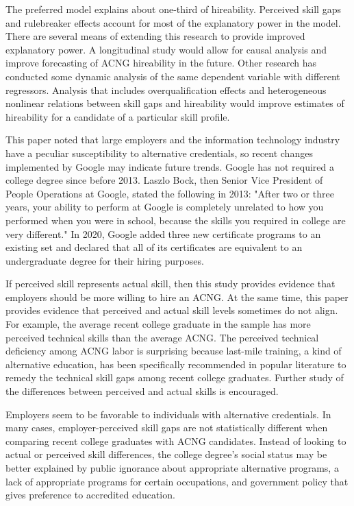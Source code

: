 \documentclass[review]{elsarticle}
\begin{document}
The preferred model explains about one-third of hireability.
Perceived skill gaps and rulebreaker effects account for most of the explanatory power in the model.
There are several means of extending this research to provide improved explanatory power.
A longitudinal study would allow for causal analysis and improve forecasting of ACNG hireability in the future.
Other research has conducted some dynamic analysis of the same dependent variable with different regressors\cite{vandivier2020preliminary}.
Analysis that includes overqualification effects and heterogeneous nonlinear relations between skill gaps and hireability would improve estimates of hireability for a candidate of a particular skill profile.

This paper noted that large employers and the information technology industry have a peculiar susceptibility to alternative credentials, so recent changes implemented by Google may indicate future trends.
Google has not required a college degree since before 2013\cite{bryant2013head}.
Laszlo Bock, then Senior Vice President of People Operations at Google, stated the following in 2013:
"After two or three years, your ability to perform at Google is completely unrelated to how you performed when you were in school, because the skills you required in college are very different."
In 2020, Google added three new certificate programs to an existing set and declared that all of its certificates are equivalent to an undergraduate degree for their hiring purposes\cite{hess_2020}.

If perceived skill represents actual skill, then this study provides evidence that employers should be more willing to hire an ACNG.
At the same time, this paper provides evidence that perceived and actual skill levels sometimes do not align.
For example, the average recent college graduate in the sample has more perceived technical skills than the average ACNG.
The perceived technical deficiency among ACNG labor is surprising because last-mile training, a kind of alternative education, has been specifically recommended in popular literature to remedy the technical skill gaps among recent college graduates.
Further study of the differences between perceived and actual skills is encouraged.

Employers seem to be favorable to individuals with alternative credentials.
In many cases, employer-perceived skill gaps are not statistically different when comparing recent college graduates with ACNG candidates.
Instead of looking to actual or perceived skill differences,
the college degree's social status may be better explained by public ignorance about appropriate alternative programs,
a lack of appropriate programs for certain occupations, and government policy that gives preference to accredited education.
\end{document}
